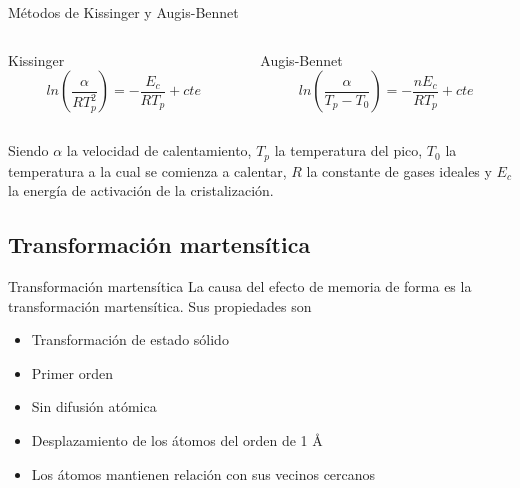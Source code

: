 \documentclass[11pt]{beamer}
\begin{document}
		\begin{frame}{Métodos de Kissinger y Augis-Bennet}
			\begin{columns}
				\begin{column}{.49\textwidth}
					Kissinger \\ 
					\begin{equation*}
						ln(\frac{\alpha}{R T_p^2}) = -\frac{E_c}{RT_p} + cte
					\end{equation*}
				\end{column}
				\begin{column}{.49\textwidth}
					Augis-Bennet\\
					\begin{equation*}
						ln(\frac{\alpha}{T_p - T_0}) = -\frac{n E_c}{RT_p} + cte
					\end{equation*}
				\end{column}
			\end{columns}
			\bigskip
			Siendo $\alpha$ la velocidad de calentamiento, $T_p$ la temperatura del pico, $T_0$ la temperatura a la cual se comienza a calentar, $R$ la constante de gases ideales y $E_c$ la energía de activación de la cristalización.
		\end{frame}	
		
		
	\subsection{Transformación martensítica}
		\begin{frame}{Transformación martensítica}
			La causa del efecto de memoria de forma es la transformación martensítica.
			Sus propiedades son
			\begin{itemize}
				\item Transformación de estado sólido
				\item Primer orden
				\item Sin difusión atómica
				\item Desplazamiento de los átomos del orden de 1 \AA
				\item Los átomos mantienen relación con sus vecinos cercanos
			\end{itemize}
		\end{frame}
		
\end{document}
